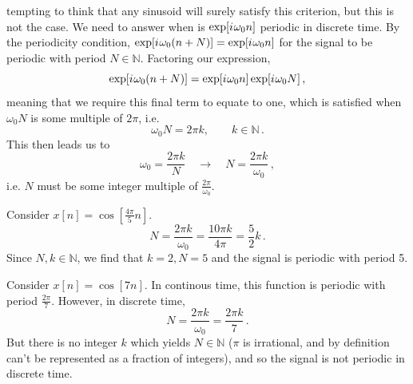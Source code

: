 tempting to think that any sinusoid will surely satisfy this criterion, but this is not
the case. We need to answer when is $\exp[{i\mkern1mu}\omega_0 n]$ periodic in discrete time. By
the periodicity condition, $\exp[{i\mkern1mu}\omega_0(n+N)] = \exp[{i\mkern1mu}\omega_0n]$ for the signal
to be periodic with period $N\in\mathbb{N}$. Factoring our expression,
%
\begin{displaymath}
  \exp[{i\mkern1mu}\omega_0(n+N)] = \exp[{i\mkern1mu}\omega_0n]\exp[{i\mkern1mu}\omega_0N] \,,
\end{displaymath}
%
meaning that we require this final term to equate to one, which is satisfied when $\omega_0N$
is some multiple of $2\pi$, i.e.
%
\begin{displaymath}
  \omega_0N = 2\pi k, \qquad k\in\mathbb{N} \,.
\end{displaymath}
%
This then leads us to
%
\begin{displaymath}
  \omega_0 = \frac{2\pi k}{N} \quad\rightarrow\quad N = \frac{2\pi k}{\omega_0} \,,
\end{displaymath}
%
i.e. $N$ must be some integer multiple of $\frac{2\pi}{\omega_0}$.
%
\begin{exmp}
  Consider $x[n] = \cos[\frac{4\pi}{5}n]$.
  \begin{displaymath}
    N = \frac{2\pi k}{\omega_0} = \frac{10\pi k}{4\pi} = \frac{5}{2}k \,.
  \end{displaymath}
  Since $N,k\in\mathbb{N}$, we find that $k=2, N=5$ and the signal is periodic with
  period 5.
\end{exmp}
\begin{exmp}
  Consider $x[n] = \cos[7n]$. In continous time, this function is periodic with period
  $\frac{2\pi}{7}$. However, in discrete time,
  \begin{displaymath}
    N = \frac{2\pi k}{\omega_0} = \frac{2\pi k}{7} \,.
  \end{displaymath}
  But there is no integer $k$ which yields $N\in\mathbb{N}$ ($\pi$ is irrational, and by
  definition can't be represented as a fraction of integers), and so the signal is not
  periodic in discrete time.
\end{exmp}


